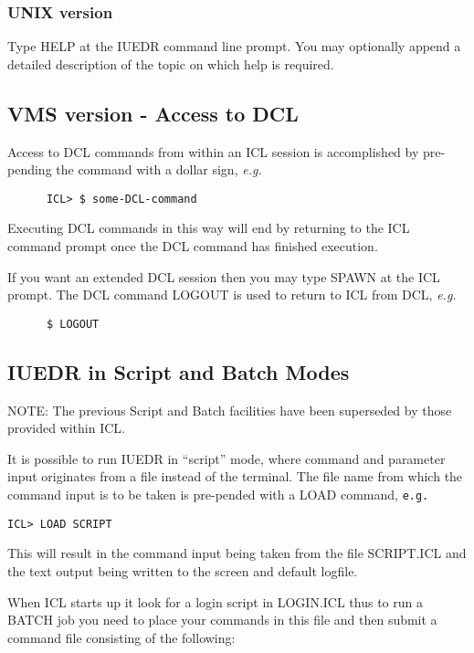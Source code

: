 \subsubsection{UNIX version}

Type HELP at the IUEDR command line prompt. You may optionally append
a detailed description of the topic on which help is required.


\subsection {VMS version - Access to DCL}

Access to DCL commands from within an ICL session is accomplished  by
pre-pending the command with a dollar sign, {\em e.g.}

\begin{verbatim}
      ICL> $ some-DCL-command
\end{verbatim}

Executing DCL commands in this way will end by returning to the ICL
command prompt once the DCL command has finished execution.

If you want an extended DCL session then you may type SPAWN at the ICL
prompt. The DCL command LOGOUT is used to return to ICL from DCL, {\em
e.g.}

\begin{verbatim}
      $ LOGOUT
\end{verbatim}

\subsection {IUEDR in Script and Batch Modes}

NOTE: The previous Script and Batch facilities have been superseded by
those provided within ICL. 

It is possible to run IUEDR in ``script'' mode, where command and
parameter input originates from a file instead of the terminal.  The
file name from which the command input is to be taken is pre-pended
with a LOAD command, {\tt e.g.}

\begin{verbatim}
ICL> LOAD SCRIPT
\end{verbatim}

This will result in the command input being taken from the file
SCRIPT.ICL and the text output being written to the screen and default
logfile.

When ICL starts up it look for a login script in LOGIN.ICL thus to 
run a BATCH job you need to place your commands in this file and then 
submit a command file consisting of the following:

